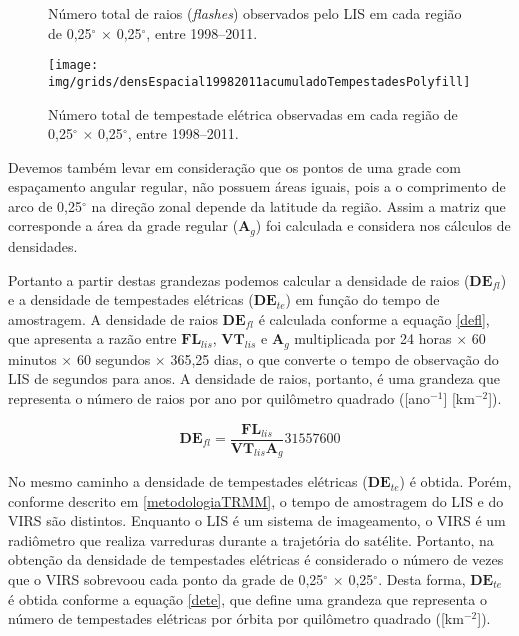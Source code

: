 
\begin{figure}[!ht]
  \centering
\caption{Número total de raios (\textit{flashes}) observados pelo LIS em cada região de 0,25$^{\circ}$  $\times$ 0,25$^{\circ}$,  entre 1998--2011.}
\label{taxatotalraios}
\end{figure}   
  
\begin{figure}[!ht]
  \centering 
  {{\texttt{[image: img/grids/densEspacial19982011acumuladoTempestadesPolyfill]}}}
\caption{Número  total de tempestade elétrica observadas em cada região de 0,25$^{\circ}$  $\times$ 0,25$^{\circ}$,  entre 1998--2011.}
\label{taxaTotalTe}
\end{figure} 

Devemos também levar em consideração que os pontos de uma grade com espaçamento angular regular, não possuem áreas iguais, pois a  o comprimento de arco de 0,25$^{\circ}$ na direção zonal depende da latitude da região. Assim a matriz que corresponde a área da grade regular ($\mathbf{A}_g$) foi calculada e considera nos cálculos de densidades.

Portanto a partir destas grandezas podemos calcular a densidade de raios ($\mathbf{DE}_{fl}$) e a densidade de tempestades elétricas ($\mathbf{DE}_{te}$) em função do tempo de amostragem. A densidade de raios $\mathbf{DE}_{fl}$ é calculada conforme a equação \ref{defl}, que apresenta a razão entre $\mathbf{FL}_{lis}$, $\mathbf{VT}_{lis}$ e $\mathbf{A}_g$ multiplicada por 24 horas $\times$ 60 minutos $\times$ 60 segundos $\times$ 365,25 dias, o que converte o tempo de observação do LIS de segundos para anos. A densidade de raios, portanto, é uma grandeza que representa o número de raios por ano por quilômetro quadrado ([ano$^{-1}$] [km$^{-2}$]).

\begin{equation}
\mathbf{DE}_{fl} = \frac{\mathbf{FL}_{lis}}{\mathbf{VT}_{lis} \mathbf{A}_g} 31557600     
\label{defl}
\end{equation}

No mesmo caminho a densidade de tempestades elétricas ($\mathbf{DE}_{te}$) é obtida. Porém, conforme descrito em \ref{metodologiaTRMM}, o tempo de amostragem do LIS e do VIRS são distintos. Enquanto o LIS é um sistema de imageamento, o VIRS é um radiômetro que realiza varreduras durante a trajetória do satélite. Portanto, na obtenção da densidade de tempestades elétricas é considerado o número de vezes que o VIRS sobrevoou cada ponto da grade de 0,25$^{\circ}$  $\times$ 0,25$^{\circ}$. Desta forma, $\mathbf{DE}_{te}$ é obtida conforme a equação \ref{dete}, que define uma grandeza que representa o número de tempestades elétricas por órbita por quilômetro quadrado ([km$^{-2}$]).

